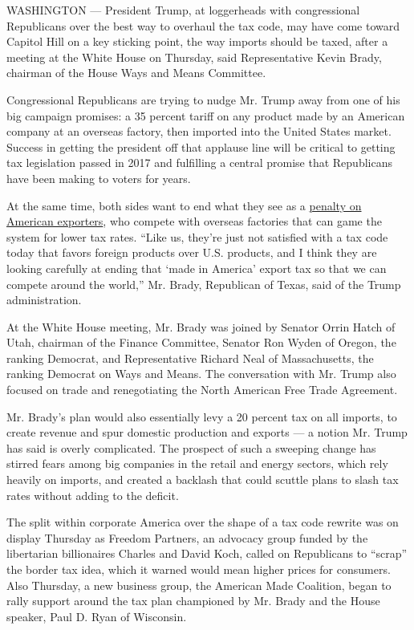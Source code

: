 WASHINGTON --- President Trump, at loggerheads with congressional
Republicans over the best way to overhaul the tax code, may have come
toward Capitol Hill on a key sticking point, the way imports should be
taxed, after a meeting at the White House on Thursday, said
Representative Kevin Brady, chairman of the House Ways and Means
Committee.

Congressional Republicans are trying to nudge Mr. Trump away from one of
his big campaign promises: a 35 percent tariff on any product made by an
American company at an overseas factory, then imported into the United
States market. Success in getting the president off that applause line
will be critical to getting tax legislation passed in 2017 and
fulfilling a central promise that Republicans have been making to voters
for years.

At the same time, both sides want to end what they see as a
\href{http://www.nationalreview.com/article/444240/donald-trump-trade-border-adjustment-best-way-level-playing-field}{penalty
on American exporters}, who compete with overseas factories that can
game the system for lower tax rates. ``Like us, they're just not
satisfied with a tax code today that favors foreign products over U.S.
products, and I think they are looking carefully at ending that `made in
America' export tax so that we can compete around the world,'' Mr.
Brady, Republican of Texas, said of the Trump administration.

At the White House meeting, Mr. Brady was joined by Senator Orrin Hatch
of Utah, chairman of the Finance Committee, Senator Ron Wyden of Oregon,
the ranking Democrat, and Representative Richard Neal of Massachusetts,
the ranking Democrat on Ways and Means. The conversation with Mr. Trump
also focused on trade and renegotiating the North American Free Trade
Agreement.

Mr. Brady's plan would also essentially levy a 20 percent tax on all
imports, to create revenue and spur domestic production and exports ---
a notion Mr. Trump has said is overly complicated. The prospect of such
a sweeping change has stirred fears among big companies in the retail
and energy sectors, which rely heavily on imports, and created a
backlash that could scuttle plans to slash tax rates without adding to
the deficit.

The split within corporate America over the shape of a tax code rewrite
was on display Thursday as Freedom Partners, an advocacy group funded by
the libertarian billionaires Charles and David Koch, called on
Republicans to ``scrap'' the border tax idea, which it warned would mean
higher prices for consumers. Also Thursday, a new business group, the
American Made Coalition, began to rally support around the tax plan
championed by Mr. Brady and the House speaker, Paul D. Ryan of
Wisconsin.

